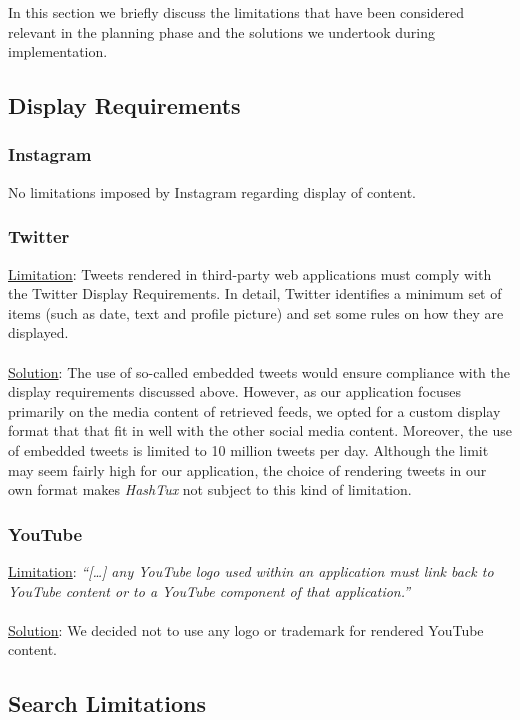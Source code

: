 In this section we briefly discuss the limitations that have been considered
relevant in the planning phase and the solutions we undertook during
implementation.

\subsection{Display Requirements}
\subsubsection{Instagram}
No limitations imposed by Instagram regarding display of content.
\subsubsection{Twitter}
\underline{Limitation}: Tweets rendered in third-party web applications must
comply with the Twitter Display Requirements. In detail, Twitter identifies a
minimum set of items (such as date, text and profile picture) and set some rules
on how they are displayed.\\ \\
\underline{Solution}: The use of so-called embedded tweets would ensure
compliance with the display requirements discussed above. However, as our
application focuses primarily on the media content of retrieved feeds, we opted
for a custom display format that that fit in well with the other social media
content. Moreover, the use of embedded tweets is limited to 10
million tweets per day. Although the limit may seem fairly high for our
application, the choice of rendering tweets in our own format makes
\textit{HashTux} not subject to this kind of limitation.
\subsubsection{YouTube}
\underline{Limitation}: \textit{``[\dots] any YouTube logo used within an
application must link back to YouTube content or to a YouTube component of
that application.''} \\ \\
\underline{Solution}: We decided not to use any logo or trademark for rendered
YouTube content.

\subsection{Search Limitations}
